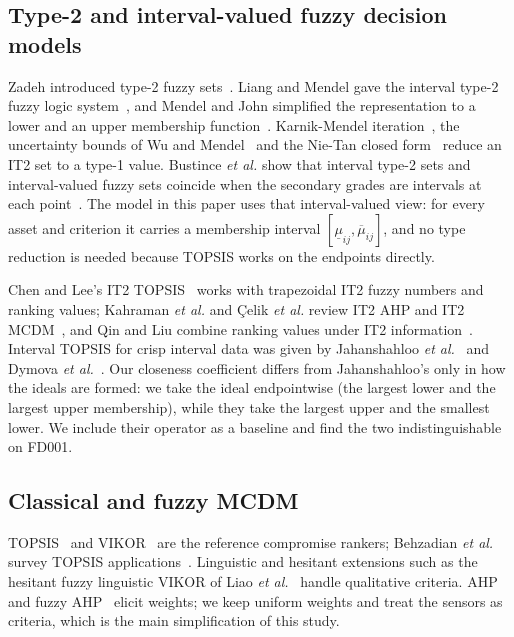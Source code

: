 \documentclass[journal,10pt,twocolumn]{IEEEtran}
\begin{document}
\subsection{Type-2 and interval-valued fuzzy decision models}
Zadeh introduced type-2 fuzzy sets~\cite{zadeh1975}. Liang and Mendel gave the interval type-2 fuzzy logic system~\cite{liang2000}, and Mendel and John simplified the representation to a lower and an upper membership function~\cite{mendel2002,mendel2006,mendel2017}. Karnik-Mendel iteration~\cite{karnik2001}, the uncertainty bounds of Wu and Mendel~\cite{wu2002} and the Nie-Tan closed form~\cite{nie2008} reduce an IT2 set to a type-1 value. Bustince \emph{et al.} show that interval type-2 sets and interval-valued fuzzy sets coincide when the secondary grades are intervals at each point~\cite{bustince2016}. The model in this paper uses that interval-valued view: for every asset and criterion it carries a membership interval $[\underline{\mu}_{ij},\overline{\mu}_{ij}]$, and no type reduction is needed because TOPSIS works on the endpoints directly.

Chen and Lee's IT2 TOPSIS~\cite{chen2010it2} works with trapezoidal IT2 fuzzy numbers and ranking values; Kahraman \emph{et al.} and \c{C}elik \emph{et al.} review IT2 AHP and IT2 MCDM~\cite{kahraman2014,celik2015}, and Qin and Liu combine ranking values under IT2 information~\cite{qin2015}. Interval TOPSIS for crisp interval data was given by Jahanshahloo \emph{et al.}~\cite{jahanshahloo2006} and Dymova \emph{et al.}~\cite{dymova2013}. Our closeness coefficient differs from Jahanshahloo's only in how the ideals are formed: we take the ideal endpointwise (the largest lower and the largest upper membership), while they take the largest upper and the smallest lower. We include their operator as a baseline and find the two indistinguishable on FD001.

\subsection{Classical and fuzzy MCDM}
TOPSIS~\cite{hwang1981} and VIKOR~\cite{opricovic2004} are the reference compromise rankers; Behzadian \emph{et al.} survey TOPSIS applications~\cite{behzadian2012}. Linguistic and hesitant extensions such as the hesitant fuzzy linguistic VIKOR of Liao \emph{et al.}~\cite{liao2015} handle qualitative criteria. AHP and fuzzy AHP~\cite{saaty1980,chang1996} elicit weights; we keep uniform weights and treat the sensors as criteria, which is the main simplification of this study.
\end{document}
